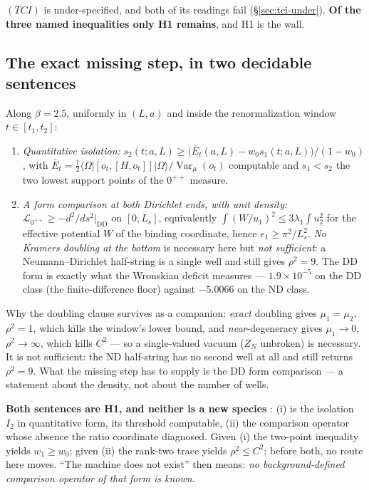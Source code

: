 \emph{$(TCI)$} is under-specified, and both of its readings fail (\S\ref{sec:tci-under}). \textbf{Of the
three named inequalities only H1 remains}, and H1 is the wall.

\subsection{The exact missing step, in two decidable sentences}

Along $\beta=2.5$, uniformly in $(L,a)$ and inside the renormalization window $t\in[t_1,t_2]$:

\begin{enumerate}
\item[(i)] \emph{Quantitative isolation:} $s_2(t;a,L)\ge\bigl(\bar E_t(a,L)-w_0s_1(t;a,L)\bigr)/(1-w_0)$,
  with $\bar E_t=\tfrac12\langle\Omega|[o_t,[H,o_t]]|\Omega\rangle/\operatorname{Var}_\mu(o_t)$
  computable and $s_1<s_2$ the two lowest support points of the $0^{++}$ measure.
\item[(ii)] \emph{A form comparison at both Dirichlet ends, with unit density:}
  $\mathcal L_{0^{++}}\ge -d^2/ds^2|_{\mathrm{DD}}$ on $[0,L_s]$, equivalently
  $\int(W/u_1)^2\le3\lambda_1\int u_2^2$ for the effective potential $W$ of the binding coordinate,
  hence $e_1\ge\pi^2/L_s^2$. \emph{No Kramers doubling at the bottom} is necessary here but \emph{not
  sufficient}: a Neumann--Dirichlet half-string is a single well and still gives $\rho^2=9$. The DD
  form is exactly what the Wronskian deficit measures --- $1.9\times10^{-5}$ on the DD class (the
  finite-difference floor) against $-5.0066$ on the ND class.
\end{enumerate}

Why the doubling clause survives as a companion: \emph{exact} doubling gives $\mu_1=\mu_2$,
$\rho^2=1$, which kills the window's lower bound, and \emph{near}-degeneracy gives $\mu_1\to0$,
$\rho^2\to\infty$, which kills $C^2$ --- so a single-valued vacuum ($Z_N$ unbroken) is necessary. It is
not sufficient: the ND half-string has no second well at all and still returns $\rho^2=9$. What the
missing step has to supply is the DD form comparison --- a statement about the density, not about the
number of wells.

\textbf{Both sentences are H1, and neither is a new species} \LN: (i) is the isolation $I_2$ in
quantitative form, its threshold computable, (ii) the comparison operator whose absence the ratio
coordinate diagnosed. Given (i) the two-point inequality yields $w_1\ge w_0$; given (ii) the rank-two
trace yields $\rho^2\le C^2$; before both, no route here moves. ``The machine does not exist'' then
means: \emph{no background-defined comparison operator of that form is known}.

